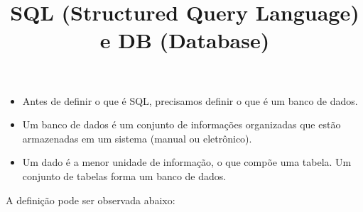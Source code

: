 \documentclass[12pt,a4paper]{article}
\title{SQL (Structured Query Language) e DB (Database)}
\author{}
\date{}
\begin{document}
\maketitle

\begin{itemize}
    \item Antes de definir o que é SQL, precisamos definir o que é um banco de dados.
    
    \item Um banco de dados é um conjunto de informações organizadas que estão armazenadas em um sistema (manual ou eletrônico).
    
    \item Um dado é a menor unidade de informação, o que compõe uma tabela. Um conjunto de tabelas forma um banco de dados.
\end{itemize}

A definição pode ser observada abaixo:
\end{document}
